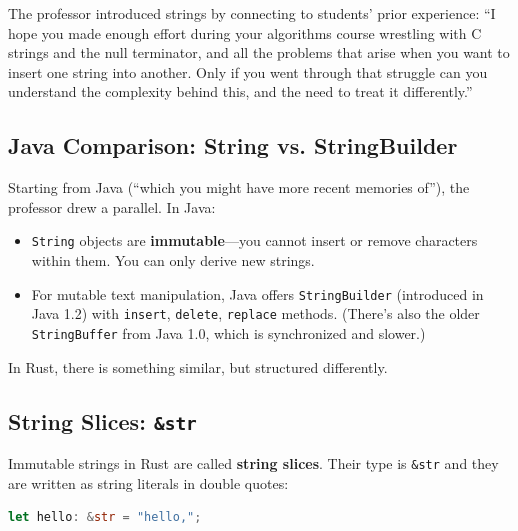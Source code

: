 
The professor introduced strings by connecting to students' prior experience: ``I hope you made enough effort during your algorithms course wrestling with C strings and the null terminator, and all the problems that arise when you want to insert one string into another. Only if you went through that struggle can you understand the complexity behind this, and the need to treat it differently.''

\subsection{Java Comparison: String vs. StringBuilder}

Starting from Java (``which you might have more recent memories of''), the professor drew a parallel. In Java:
\begin{itemize}
    \item \texttt{String} objects are \textbf{immutable}---you cannot insert or remove characters within them. You can only derive new strings.
    \item For mutable text manipulation, Java offers \texttt{StringBuilder} (introduced in Java 1.2) with \texttt{insert}, \texttt{delete}, \texttt{replace} methods. (There's also the older \texttt{StringBuffer} from Java 1.0, which is synchronized and slower.)
\end{itemize}

In Rust, there is something similar, but structured differently.

\subsection{String Slices: \texttt{\&str}}

Immutable strings in Rust are called \textbf{string slices}. Their type is \texttt{\&str} and they are written as string literals in double quotes:

\begin{lstlisting}[language=Rust]
let hello: &str = "hello,";
\end{lstlisting}

